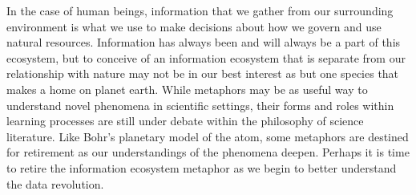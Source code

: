  In the case of human beings, information that we gather from our surrounding environment is what we use to make decisions about how we govern and use natural resources. Information has always been and will always be a part of this ecosystem, but to conceive of an information ecosystem that is separate from our relationship with nature may not be in our best interest as but one species that makes a home on planet earth. While metaphors may be as useful way to understand novel phenomena in scientific settings, their forms and roles within learning processes are still under debate within the philosophy of science literature. Like Bohr's planetary model of the atom, some metaphors are destined for retirement as our understandings of the phenomena deepen. Perhaps it is time to retire the information ecosystem metaphor as we begin to better understand the data revolution.